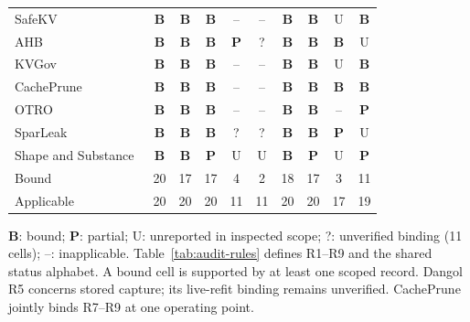 \begin{table}[t]
\begin{tabularx}{\columnwidth}{@{}Y*{9}{c}@{}}
SafeKV~\cite{chu2025safekv} & \textbf{B} & \textbf{B} & \textbf{B} & -- & -- & \textbf{B} & \textbf{B} & U & \textbf{B}\\
AHB~\cite{zhu2026turing} & \textbf{B} & \textbf{B} & \textbf{B} & \textbf{P} & ? & \textbf{B} & \textbf{B} & \textbf{B} & U\\
KVGov~\cite{addagada2026kvgov} & \textbf{B} & \textbf{B} & \textbf{B} & -- & -- & \textbf{B} & \textbf{B} & U & \textbf{B}\\
CachePrune~\cite{wu2026cacheprune} & \textbf{B} & \textbf{B} & \textbf{B} & -- & -- & \textbf{B} & \textbf{B} & \textbf{B} & \textbf{B}\\
OTRO~\cite{lee2026otro} & \textbf{B} & \textbf{B} & \textbf{B} & -- & -- & \textbf{B} & \textbf{B} & -- & \textbf{P}\\
SparLeak~\cite{chen2026sparleak} & \textbf{B} & \textbf{B} & \textbf{B} & ? & ? & \textbf{B} & \textbf{B} & \textbf{P} & U\\
Shape and Substance~\cite{hadad2026shape} & \textbf{B} & \textbf{B} & \textbf{P} & U & U & \textbf{B} & \textbf{P} & U & \textbf{P}\\
\midrule Bound & 20 & 17 & 17 & 4 & 2 & 18 & 17 & 3 & 11\\
Applicable & 20 & 20 & 20 & 11 & 11 & 20 & 20 & 17 & 19\\
\bottomrule\end{tabularx}
\par\smallskip\raggedright \textbf{B}: bound; \textbf{P}: partial; U: unreported in inspected scope; ?: unverified binding (11 cells); --: inapplicable. Table~\ref{tab:audit-rules} defines R1--R9 and the shared status alphabet. A bound cell is supported by at least one scoped record. Dangol R5 concerns stored capture; its live-refit binding remains unverified. CachePrune jointly binds R7--R9 at one operating point.
\end{table}

